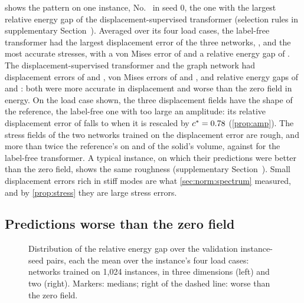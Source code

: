  shows the pattern on one instance, No.~\numWorstIndex{} in seed 0,
the one with the largest relative energy gap of the displacement-supervised transformer
(selection rules in supplementary Section~\SuppRepro{}).
Averaged over its four load cases, the label-free transformer had the largest displacement
error of the three networks, \numWorstFreeDisp{}, and the most accurate stresses, with a von
Mises error of \numWorstFreeVm{} and a relative energy gap of \numWorstFreeGap{}. The
displacement-supervised transformer and the graph network had displacement errors of
\numWorstLabDisp{} and \numWorstMgnDisp{}, von Mises errors of \numWorstLabVm{} and
\numWorstMgnVm{}, and relative energy gaps of \numWorstLabGap{} and \numWorstMgnGap{}: both
were more accurate in displacement and worse than the zero field in energy. On the load case
shown, the three displacement fields have the shape of the reference, the label-free one
with too large an amplitude: its relative displacement error of \numFigWorstFreeDisp{} falls
to \numFigWorstFreeDispC{} when it is rescaled by $c^{\ast}=0.78{}$
(\cref{prop:amp}). The stress fields of the two networks trained on the displacement error
are rough, and more than twice the reference's on \numFigWorstTwiceLab{} and
\numFigWorstTwiceMgn{} of the solid's volume, against \numFigWorstTwiceFree{} for the label-free transformer. A typical instance, on which their predictions were better than the
zero field, shows the same roughness (supplementary Section~\SuppThree{}). Small
displacement errors rich in stiff modes are what \cref{sec:norm:spectrum} measured, and by
\cref{prop:stress} they are large stress errors.

\subsection{Predictions worse than the zero field}\label{sec:checks:zero}

\begin{figure}[tbp]
\centering
{}
\caption{Distribution of the relative energy gap over the \numThreePairs{} validation
instance-seed pairs, each the mean over the instance's four load cases: networks trained on
1,024 instances, in three dimensions (left) and two (right). Markers: medians; right of the
dashed line: worse than the zero field.}
\label{fig:energygap}
\end{figure}

